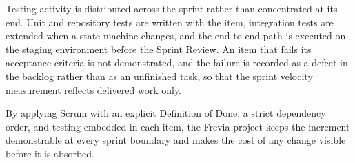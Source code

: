 Testing activity is distributed across the sprint rather than concentrated at its end. Unit and repository tests are written with the item, integration tests are extended when a state machine changes, and the end-to-end path is executed on the staging environment before the Sprint Review. An item that fails its acceptance criteria is not demonstrated, and the failure is recorded as a defect in the backlog rather than as an unfinished task, so that the sprint velocity measurement reflects delivered work only.

By applying Scrum with an explicit Definition of Done, a strict dependency order, and testing embedded in each item, the Frevia project keeps the increment demonstrable at every sprint boundary and makes the cost of any change visible before it is absorbed.
